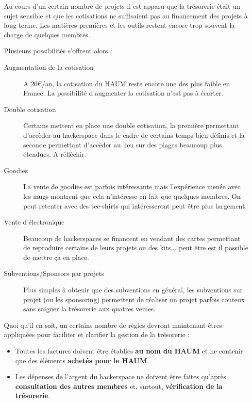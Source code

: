 \documentclass[11pt]{article}
\begin{document}
Au cours d'un certain nombre de projets il est apparu que la trésorerie était un sujet sensible et que les cotisations
ne suffisaient pas au financement des projets à long terme. Les matières premières et les outils restent encore trop
souvent la charge de quelques membres.

Plusieurs possibilités s'offrent alors :

\begin{description}
	\item[Augmentation de la cotisation] A 20\euro/an, la cotisation du HAUM reste encore une des plus faible en France. La
		possibilité d'augmenter la cotisation n'est pas à écarter.
	\item[Double cotisation] Certains mettent en place une double cotisation, la première permettant d'accèder au
		hackerspace dans le cadre de certains temps bien définis et la seconde permettant d'accèder au lieu sur des
		plages beaucoup plus étendues. A réfléchir.
	\item[Goodies] La vente de goodies est parfois intéressante mais l'expérience menée avec les mugs montrent que cela
		n'intéresse en fait que quelques membres. On peut retenter avec des tee-shirts qui intéresseront peut être plus
		largement.
	\item[Vente d'électronique] Beaucoup de hackerspaces se financent en vendant des cartes permettant de reproduire
		certains de leurs projets ou des kits... peut être est il possible de mettre ça en place.
	\item[Subventions/Sponsors par projets] Plus simples à obtenir que des subventions en général, les subventions sur
		projet (ou les sponsoring) permettent de réaliser un projet parfois couteux sans saigner la trésorerie aux
		quatres veines.
\end{description}

Quoi qu'il en soit, un certains nombre de règles devront maintenant êtres appliquées pour faciliter et clarifier la
gestion de la trésorerie :

\begin{itemize}
	\item Toutes les factures doivent être établies \textbf{au nom du HAUM} et ne contenir que des éléments
		\textbf{achetés pour le HAUM}. 
	\item Les dépenses de l'argent du hackerspace ne doivent être faites qu'après \textbf{consultation des autres
		membres} et, surtout, \textbf{vérification de la trésorerie}.
\end{itemize}
\end{document}
